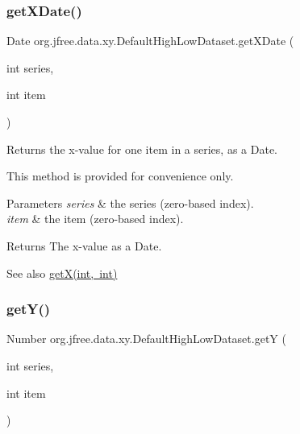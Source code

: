 \subsubsection{\texorpdfstring{get\+X\+Date()}{getXDate()}}
{\footnotesize\ttfamily Date org.\+jfree.\+data.\+xy.\+Default\+High\+Low\+Dataset.\+get\+X\+Date (\begin{DoxyParamCaption}\item[{int}]{series,  }\item[{int}]{item }\end{DoxyParamCaption})}

Returns the x-\/value for one item in a series, as a Date. 

This method is provided for convenience only.


\begin{DoxyParams}{Parameters}
{\em series} & the series (zero-\/based index). \\
\hline
{\em item} & the item (zero-\/based index).\\
\hline
\end{DoxyParams}
\begin{DoxyReturn}{Returns}
The x-\/value as a Date.
\end{DoxyReturn}
\begin{DoxySeeAlso}{See also}
\mbox{\hyperlink{classorg_1_1jfree_1_1data_1_1xy_1_1_default_high_low_dataset_aa55b6574aaf34207a1a53e6bd8e422ea}{get\+X(int, int)}} 
\end{DoxySeeAlso}
\mbox{\label{classorg_1_1jfree_1_1data_1_1xy_1_1_default_high_low_dataset_a0a62365f2ccccaf19cd49e003daeb5bc}} 
\subsubsection{\texorpdfstring{get\+Y()}{getY()}}
{\footnotesize\ttfamily Number org.\+jfree.\+data.\+xy.\+Default\+High\+Low\+Dataset.\+getY (\begin{DoxyParamCaption}\item[{int}]{series,  }\item[{int}]{item }\end{DoxyParamCaption})}

